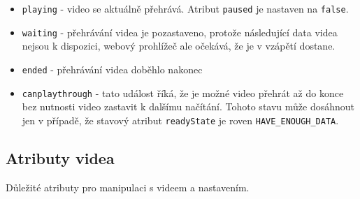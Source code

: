 \begin{itemize}
	\item \texttt{playing} - video se aktuálně přehrává. Atribut \texttt{paused} je nastaven na \texttt{false}.	
	
	\item \texttt{waiting} - přehrávání videa je pozastaveno, protože následující data videa nejsou k dispozici, webový prohlížeč ale očekává, že je v vzápětí dostane.
	
	\item \texttt{ended} - přehrávání videa doběhlo nakonec
	
	\item \texttt{canplaythrough} - tato událost říká, že je možné video přehrát až do konce bez nutnosti video zastavit k dalšímu načítání. Tohoto stavu může dosáhnout jen v případě, že stavový atribut \texttt{readyState} je roven \texttt{HAVE\_ENOUGH\_DATA}. \cite{html5}
	
\end{itemize}

\newpage

\subsection{Atributy videa}
Důležité atributy pro manipulaci s videem a nastavením.



